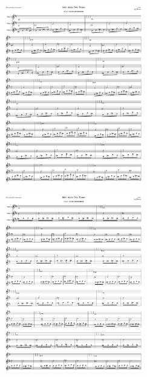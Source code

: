 \begin{figure}[H]                                             
{                                                             
  \setlength{\tabcolsep}{3.0pt}                               
  \setlength\cmidrulewidth{\heavyrulewidth} %
    \begin{subfigure}{0.5\textwidth}                            
  \includegraphics[width=6cm]{music/title_no_45_page_1001.png}%
    \end{subfigure}                                             
  \begin{subfigure}{0.5\textwidth}                            
  \includegraphics[width=6cm]{music/title_no_46_page_1001.png}%
    \end{subfigure}                                             
}                                                             
\end{figure}                                                  



